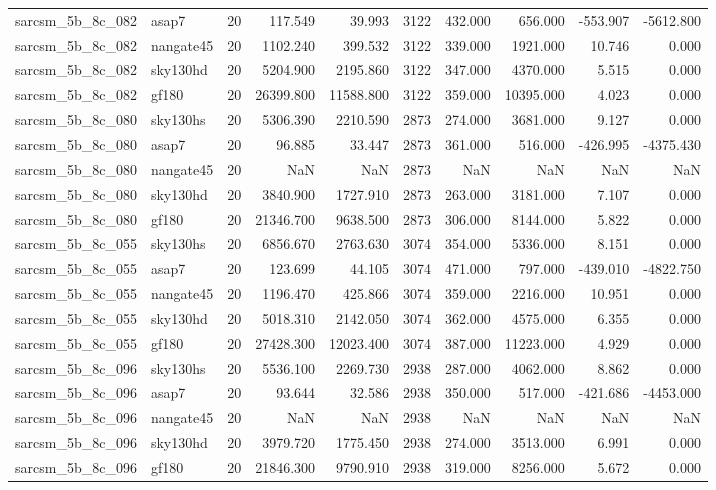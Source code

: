 \documentclass{article}
\begin{document}
\begin{longtable}{llrrrrrrrr}
sarcsm\_5b\_8c\_082 & asap7 & 20 & 117.549 & 39.993 & 3122 & 432.000 & 656.000 & -553.907 & -5612.800 \\
sarcsm\_5b\_8c\_082 & nangate45 & 20 & 1102.240 & 399.532 & 3122 & 339.000 & 1921.000 & 10.746 & 0.000 \\
sarcsm\_5b\_8c\_082 & sky130hd & 20 & 5204.900 & 2195.860 & 3122 & 347.000 & 4370.000 & 5.515 & 0.000 \\
sarcsm\_5b\_8c\_082 & gf180 & 20 & 26399.800 & 11588.800 & 3122 & 359.000 & 10395.000 & 4.023 & 0.000 \\
sarcsm\_5b\_8c\_080 & sky130hs & 20 & 5306.390 & 2210.590 & 2873 & 274.000 & 3681.000 & 9.127 & 0.000 \\
sarcsm\_5b\_8c\_080 & asap7 & 20 & 96.885 & 33.447 & 2873 & 361.000 & 516.000 & -426.995 & -4375.430 \\
sarcsm\_5b\_8c\_080 & nangate45 & 20 & NaN & NaN & 2873 & NaN & NaN & NaN & NaN \\
sarcsm\_5b\_8c\_080 & sky130hd & 20 & 3840.900 & 1727.910 & 2873 & 263.000 & 3181.000 & 7.107 & 0.000 \\
sarcsm\_5b\_8c\_080 & gf180 & 20 & 21346.700 & 9638.500 & 2873 & 306.000 & 8144.000 & 5.822 & 0.000 \\
sarcsm\_5b\_8c\_055 & sky130hs & 20 & 6856.670 & 2763.630 & 3074 & 354.000 & 5336.000 & 8.151 & 0.000 \\
sarcsm\_5b\_8c\_055 & asap7 & 20 & 123.699 & 44.105 & 3074 & 471.000 & 797.000 & -439.010 & -4822.750 \\
sarcsm\_5b\_8c\_055 & nangate45 & 20 & 1196.470 & 425.866 & 3074 & 359.000 & 2216.000 & 10.951 & 0.000 \\
sarcsm\_5b\_8c\_055 & sky130hd & 20 & 5018.310 & 2142.050 & 3074 & 362.000 & 4575.000 & 6.355 & 0.000 \\
sarcsm\_5b\_8c\_055 & gf180 & 20 & 27428.300 & 12023.400 & 3074 & 387.000 & 11223.000 & 4.929 & 0.000 \\
sarcsm\_5b\_8c\_096 & sky130hs & 20 & 5536.100 & 2269.730 & 2938 & 287.000 & 4062.000 & 8.862 & 0.000 \\
sarcsm\_5b\_8c\_096 & asap7 & 20 & 93.644 & 32.586 & 2938 & 350.000 & 517.000 & -421.686 & -4453.000 \\
sarcsm\_5b\_8c\_096 & nangate45 & 20 & NaN & NaN & 2938 & NaN & NaN & NaN & NaN \\
sarcsm\_5b\_8c\_096 & sky130hd & 20 & 3979.720 & 1775.450 & 2938 & 274.000 & 3513.000 & 6.991 & 0.000 \\
sarcsm\_5b\_8c\_096 & gf180 & 20 & 21846.300 & 9790.910 & 2938 & 319.000 & 8256.000 & 5.672 & 0.000 \\

\end{longtable}
\end{document}
